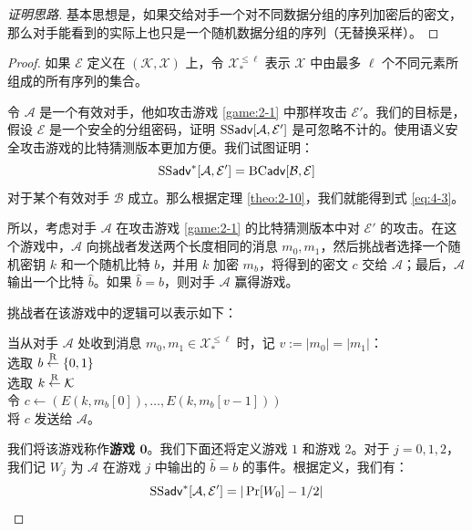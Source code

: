 \begin{proof}[证明思路]
基本思想是，如果交给对手一个对不同数据分组的序列加密后的密文，那么对手能看到的实际上也只是一个随机数据分组的序列（无替换采样）。
\end{proof}

\begin{proof}
如果 $\mathcal{E}$ 定义在 $(\mathcal{K},\mathcal{X})$ 上，令 $\mathcal{X}_*^{\leq\ell}$ 表示 $\mathcal{X}$ 中由最多 $\ell$ 个不同元素所组成的所有序列的集合。

令 $\mathcal{A}$ 是一个有效对手，他如攻击游戏 \ref{game:2-1} 中那样攻击 $\mathcal{E}'$。我们的目标是，假设 $\mathcal{E}$ 是一个安全的分组密码，证明 ${\rm SS\mathsf{adv}}[\mathcal{A},\mathcal{E}']$ 是可忽略不计的。使用语义安全攻击游戏的比特猜测版本更加方便。我们试图证明：
\begin{equation}\label{eq:4-4}
{\rm SS\mathsf{adv}}^*[\mathcal{A},\mathcal{E}']={\rm BC\mathsf{adv}}[\mathcal{B},\mathcal{E}]
\end{equation}
对于某个有效对手 $\mathcal{B}$ 成立。那么根据定理 \ref{theo:2-10}，我们就能得到式 \ref{eq:4-3}。

所以，考虑对手 $\mathcal{A}$ 在攻击游戏 \ref{game:2-1} 的比特猜测版本中对 $\mathcal{E}'$ 的攻击。在这个游戏中，$\mathcal{A}$ 向挑战者发送两个长度相同的消息 $m_0,m_1$，然后挑战者选择一个随机密钥 $k$ 和一个随机比特 $b$，并用 $k$ 加密 $m_b$，将得到的密文 $c$ 交给 $\mathcal{A}$；最后，$\mathcal{A}$ 输出一个比特 $\hat b$。如果 $\hat b=b$，则对手 $\mathcal{A}$ 赢得游戏。

挑战者在该游戏中的逻辑可以表示如下：

\vspace*{5pt}

\hspace*{5pt} 当从对手 $\mathcal{A}$ 处收到消息 $m_0,m_1\in\mathcal{X}_*^{\leq\ell}$ 时，记 $v:=|m_0|=|m_1|$：\\
\hspace*{50pt} 选取 $b\overset{\rm R}\leftarrow\{0,1\}$\\
\hspace*{50pt} 选取 $k\overset{\rm R}\leftarrow\mathcal{K}$\\
\hspace*{50pt} 令 $c\leftarrow(E(k,m_b[0]),\dots,E(k, m_b[v-1]))$\\
\hspace*{50pt} 将 $c$ 发送给 $\mathcal{A}$。

\vspace*{5pt}

我们将该游戏称作\textbf{游戏 $\mathbf{0}$}。我们下面还将定义游戏 $1$ 和游戏 $2$。对于 $j=0,1,2$，我们记 $W_j$ 为 $\mathcal{A}$ 在游戏 $j$ 中输出的 $\hat b=b$ 的事件。根据定义，我们有：
\begin{equation}\label{eq:4-5}
{\rm SS\mathsf{adv}}^*[\mathcal{A},\mathcal{E}']=|\Pr[W_0]-{1}/{2}|
\end{equation}


\end{proof}
